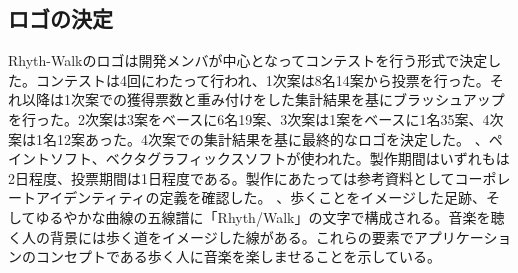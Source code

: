 \subsection{ロゴの決定}
\par Rhyth-Walkのロゴは開発メンバが中心となってコンテストを行う形式で決定した。コンテストは4回にわたって行われ、1次案は8名14案から投票を行った。それ以降は1次案での獲得票数と重み付けをした集計結果を基にブラッシュアップを行った。2次案は3案をベースに6名19案、3次案は1案をベースに1名35案、4次案は1名12案あった。4次案での集計結果を基に最終的なロゴを決定した。
、ペイントソフト、ベクタグラフィックスソフトが使われた。製作期間はいずれもは2日程度、投票期間は1日程度である。製作にあたっては参考資料としてコーポレートアイデンティティの定義を確認した。
、歩くことをイメージした足跡、そしてゆるやかな曲線の五線譜に「Rhyth/Walk」の文字で構成される。音楽を聴く人の背景には歩く道をイメージした線がある。これらの要素でアプリケーションのコンセプトである歩く人に音楽を楽しませることを示している。

